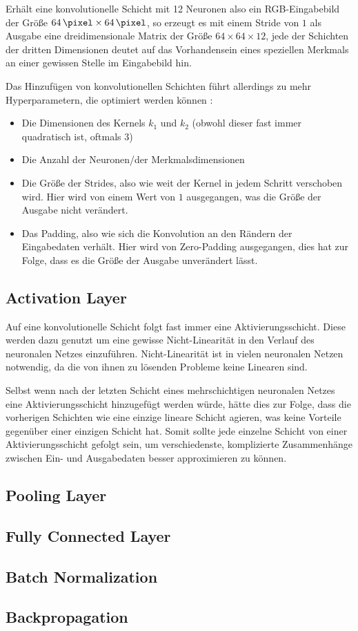 Erhält eine konvolutionelle Schicht mit 12 Neuronen also \bspw ein RGB-Eingabebild der Größe $\SI{64}{\pixel}\times\SI{64}{\pixel}$, so erzeugt es mit einem Stride von $1$ als Ausgabe eine dreidimensionale Matrix der Größe $64\times64\times12$, jede der Schichten der dritten Dimensionen deutet auf das Vorhandensein eines speziellen Merkmals an einer gewissen Stelle im Eingabebild hin.

Das Hinzufügen von konvolutionellen Schichten führt allerdings zu mehr Hyperparametern, die optimiert werden können \cite{cs231n}:
\begin{itemize}
	\item Die Dimensionen des Kernels $k_1$ und $k_2$ (obwohl dieser fast immer quadratisch ist, oftmals $3$)
	\item Die Anzahl der Neuronen/der Merkmalsdimensionen
	\item Die Größe der Strides, also wie weit der Kernel in jedem Schritt verschoben wird. Hier wird von einem Wert von $1$ ausgegangen, was die Größe der Ausgabe nicht verändert.
	\item Das Padding, also wie sich die Konvolution an den Rändern der Eingabedaten verhält. Hier wird von Zero-Padding ausgegangen, dies hat zur Folge, dass es die Größe der Ausgabe unverändert lässt.
\end{itemize}

\subsection{Activation Layer}
\label{ssec:activation}

Auf eine konvolutionelle Schicht folgt fast immer eine Aktivierungsschicht. Diese werden dazu genutzt um eine gewisse Nicht-Linearität in den Verlauf des neuronalen Netzes einzuführen. Nicht-Linearität ist in vielen neuronalen Netzen notwendig, da die von ihnen zu lösenden Probleme keine Linearen sind. \cite[Kap.~6]{deeplearning_16}

Selbst wenn nach der letzten Schicht eines mehrschichtigen neuronalen Netzes eine Aktivierungsschicht hinzugefügt werden würde, hätte dies zur Folge, dass die vorherigen Schichten wie eine einzige lineare Schicht agieren, was keine Vorteile gegenüber einer einzigen Schicht hat. Somit sollte jede einzelne Schicht von einer Aktivierungsschicht gefolgt sein, um verschiedenste, komplizierte Zusammenhänge zwischen Ein- und Ausgabedaten besser approximieren zu können.

\subsection{Pooling Layer}
\label{ssec:pooling}

\subsection{Fully Connected Layer}
\label{ssec:fcn}

\subsection{Batch Normalization}
\label{ssec:fcn}

\subsection{Backpropagation}
\label{ssec:backpropagation}